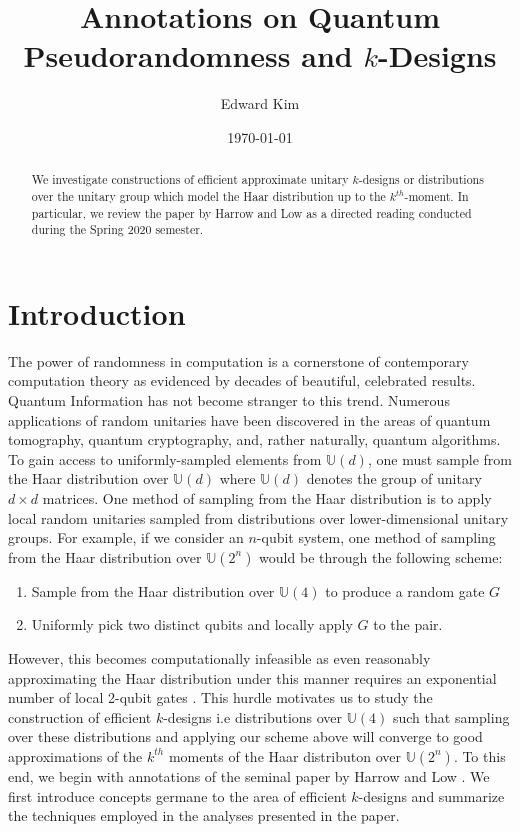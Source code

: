 \documentclass[12pt]{amsart}
\theoremstyle{definition}
\theoremstyle{remark}
\numberwithin{equation}{section}
\theoremstyle{remark}
\begin{document}
\title{Annotations on Quantum Pseudorandomness and $k$-Designs}
\author{Edward Kim}
\date{\today}
\maketitle

\begin{abstract}
  We investigate constructions of efficient approximate unitary $k$-designs or distributions over the unitary group which model the Haar distribution up to the $k^{th}$-moment. In particular, we review the paper by Harrow and Low as a directed reading conducted during the Spring 2020 semester.
\end{abstract}

\tableofcontents

\section{Introduction}

The power of randomness in computation is a cornerstone of contemporary computation theory as evidenced by decades of beautiful, celebrated results. Quantum Information has not become stranger to this trend. Numerous applications of random unitaries have been discovered in the areas of quantum tomography, quantum cryptography, and, rather naturally, quantum algorithms. To gain access to uniformly-sampled elements from $\mathbb{U}(d)$, one must sample from the Haar distribution over $\mathbb{U}(d)$ where $\mathbb{U}(d)$ denotes the group of unitary $d \times d$ matrices. One method of sampling from the Haar distribution is to apply local random unitaries sampled from distributions over lower-dimensional unitary groups. For example, if we consider an $n$-qubit system, one method of sampling from the Haar distribution over $\mathbb{U}(2^n)$ would be through the following scheme:
\begin{enumerate}
  \item Sample from the Haar distribution over $\mathbb{U}(4)$ to produce a random gate $G$
  \item Uniformly pick two distinct qubits and locally apply $G$ to the pair.
\end{enumerate}
However, this becomes computationally infeasible as even reasonably approximating the Haar distribution under this manner requires an exponential number of local 2-qubit gates \cite{knill}. This hurdle motivates us to study the construction of efficient $k$-designs i.e distributions over $\mathbb{U}(4)$ such that sampling over these distributions and applying our scheme above will converge to good approximations of the $k^{th}$ moments of the Haar distributon over $\mathbb{U}(2^n)$. To this end, we begin with annotations of the seminal paper by Harrow and Low \cite{harrlow}. We first introduce concepts germane to the area of efficient $k$-designs and summarize the techniques employed in the analyses presented in the paper.
\end{document}
